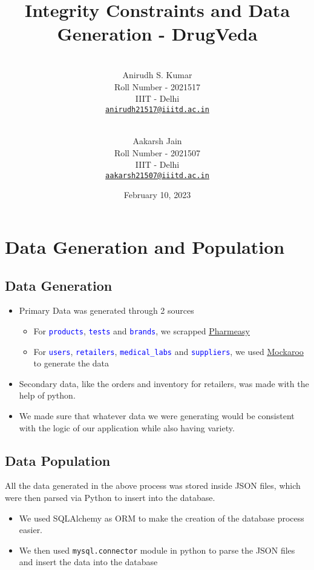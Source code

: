 \documentclass{article}
\title{Integrity Constraints and Data Generation - DrugVeda}
\author{
    \\\vspace{0em} Anirudh S. Kumar \\\vspace{-0.5em}
    \footnotesize{Roll Number - 2021517}\\\vspace{-0.5em}
    \footnotesize{IIIT - Delhi}\\\vspace{-0.5em}
    \footnotesize{\href{mailto:anirudh21517@iiitd.ac.in}{\texttt{anirudh21517@iiitd.ac.in}}}
  \and
    \\\vspace{0em} Aakarsh Jain \\\vspace{-0.5em}
    \footnotesize{Roll Number - 2021507}\\\vspace{-0.5em}
    \footnotesize{IIIT - Delhi}\\\vspace{-0.5em}
    \footnotesize{\href{mailto:aakarsh21507@iiitd.ac.in}{\texttt{aakarsh21507@iiitd.ac.in}}} 
    \vspace{1em}
}
\date{February 10, 2023}
\begin{document}
\maketitle

\section{Data Generation and Population}

\subsection{Data Generation}
\begin{itemize}
    \item Primary Data was generated through 2 sources
    \begin{itemize}
        \item For \textcolor{blue}{\texttt{products}}, \textcolor{blue}{\texttt{tests}} and \textcolor{blue}{\texttt{brands}}, we scrapped  \href{https://pharmeasy.in/}{\underline{Pharmeasy}}
        \item For \textcolor{blue}{\texttt{users}}, \textcolor{blue}{\texttt{retailers}}, \textcolor{blue}{\texttt{medical\_labs}} and \textcolor{blue}{\texttt{suppliers}}, we used 
        \href{https://mockaroo.com/}{\underline{Mockaroo}} to generate the data
    \end{itemize}

    \item Secondary data, like the orders and inventory for retailers, was made with the help of python.

    \item We made sure that whatever data we were generating would be consistent with the logic of our application while also having variety.
\end{itemize}

\subsection{Data Population}

All the data generated in the above process was stored inside JSON files, which were then parsed via Python to insert into the database.

\begin{itemize}
    \item We used SQLAlchemy as ORM to make the creation of the database process easier.
    \item We then used \texttt{mysql.connector} module in python to parse the JSON files and insert the data into the database
\end{itemize}
\end{document}
